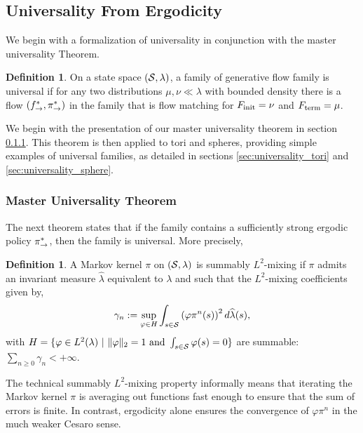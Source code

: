 \documentclass{article}
\theoremstyle{plain}
\theoremstyle{definition}
\newtheorem{definition}[theorem]{Definition}
\theoremstyle{remark}
\theoremstyle{fact}
\begin{document}
\subsection{Universality From Ergodicity}
\label{sec:universality}
We begin with a formalization of universality in conjunction with the master universality Theorem.
\begin{definition}\label{def:universal_family}
On a state space $(\mathcal S,\lambda)$, a family of generative flow family is 
universal if for any two distributions $\mu,\nu\ll \lambda$ with bounded density there is a flow $(f^*_{\rightarrow},\pi_{\rightarrow}^*)$ in the family that is flow matching for $F_{\mathrm{init}}=\nu$ and $F_{\mathrm{term}}=\mu$.
\end{definition}


We begin with the presentation of our master universality theorem in section \ref{sec:universality_master}. This theorem is then applied to tori and spheres, providing simple examples of universal families, as detailed in sections \ref{sec:universality_tori} and \ref{sec:universality_sphere}.


\subsubsection{Master Universality Theorem}
\label{sec:universality_master}
The next theorem states that if the family contains a sufficiently strong ergodic policy $\pi_{\rightarrow}^*$, then the family is universal. More precisely,
\begin{definition}\label{def:summably_mixing} A Markov kernel $\pi$ on $(\mathcal S,\lambda)$ is summably $L^2$-mixing if $\pi$ admits an invariant measure $\widehat \lambda$ equivalent to $\lambda$ and such that the $L^2$-mixing coefficients given by,
\begin{equation}
    \gamma_n := \sup_{\varphi \in H} \int_{s\in \mathcal S}
    \left(\varphi\pi^n(s)\right)^2 d\widehat \lambda(s), 
\end{equation}
with $H = \{\varphi \in L^2(\lambda)~|~\|\varphi\|_2 = 1 \text{ and } \int_{s\in \mathcal S} \varphi(s)=0\}$
are summable: $\sum_{n\geq 0} \gamma_n < +\infty$.
\end{definition}

The technical summably $L^2$-mixing property informally means that iterating the Markov kernel $\pi$ is averaging out functions fast enough to ensure that the sum of errors is finite. In contrast, ergodicity alone ensures the convergence of $\varphi \pi^n$ in the much weaker Cesaro sense.
\end{document}

